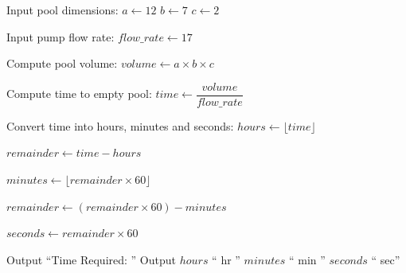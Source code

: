 \begin{algorithm}
\caption{Calculate Time Required to Empty a Pool}
\begin{algorithmic}[1]

\STATE Input pool dimensions:
\STATE $a \gets 12$
\STATE $b \gets 7$
\STATE $c \gets 2$

\STATE Input pump flow rate:
\STATE $flow\_rate \gets 17$

\STATE Compute pool volume:
\STATE $volume \gets a \times b \times c$

\STATE Compute time to empty pool:
\STATE $time \gets \dfrac{volume}{flow\_rate}$

\STATE Convert time into hours, minutes and seconds:
\STATE $hours \gets \lfloor time \rfloor$

\STATE $remainder \gets time - hours$

\STATE $minutes \gets \lfloor remainder \times 60 \rfloor$

\STATE $remainder \gets (remainder \times 60) - minutes$

\STATE $seconds \gets remainder \times 60$

\STATE Output ``Time Required: ''
\STATE Output $hours$ `` hr '' $minutes$ `` min '' $seconds$ `` sec''

\end{algorithmic}
\end{algorithm}